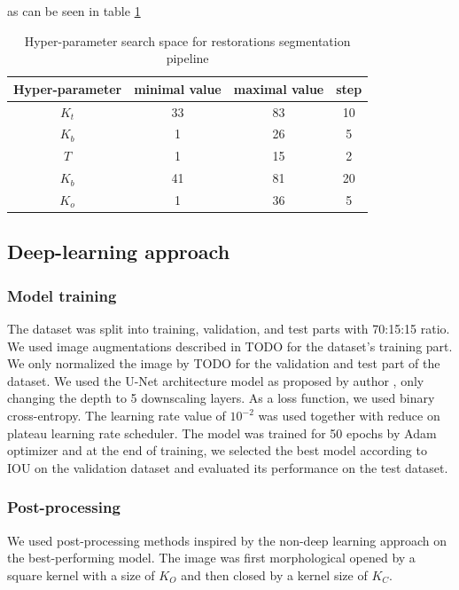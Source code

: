 as can be seen in table \ref{tab:hyper_param_segmentation}
\begin{table}
    \begin{tabular}{|c|c|c|c|}
        \hline
        Hyper-parameter & minimal value & maximal value & step \\ \hline
        $K_t$           & 33            & 83            & 10   \\ \hline
        $K_b$           & 1             & 26            & 5    \\ \hline
        $T$             & 1             & 15            & 2    \\ \hline
        $K_b$           & 41            & 81            & 20   \\ \hline
        $K_o$           & 1             & 36            & 5    \\ \hline
    \end{tabular}
    \caption{Hyper-parameter search space for restorations segmentation pipeline}
    \label{tab:hyper_param_segmentation}
\end{table}

\subsection{Deep-learning approach}
\subsubsection{Model training}
The dataset was split into training, validation, and test parts with 70:15:15 ratio. We used image augmentations described in TODO for the dataset's training part. We only normalized the image by TODO for the validation and test part of the dataset.
We used the U-Net architecture model as proposed by author \cite{Ronneberger2015}, only changing the depth to 5 downscaling layers. As a loss function, we used binary cross-entropy. The learning rate value of $10^{-2}$ was used together with reduce on plateau learning rate scheduler. The model was trained for 50 epochs by Adam optimizer and at the end of training, we selected the best model according to IOU on the validation dataset and evaluated its performance on the test dataset.

\subsubsection{Post-processing}
We used post-processing methods inspired by the non-deep learning approach on the best-performing model. The image was first morphological opened by a square kernel with a size of $K_O$ and then closed by a kernel size of $K_C$.

